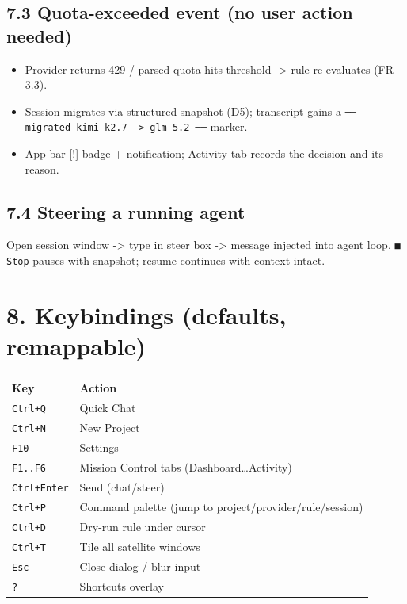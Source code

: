 \documentclass[10pt,a4paper]{article}
\begin{document}
\subsection{7.3 Quota-exceeded event (no user action needed)}
\begin{itemize}
  \item Provider returns 429 / parsed quota hits threshold -> rule re-evaluates (FR-3.3).
  \item Session migrates via structured snapshot (D5); transcript gains a
\texttt{── migrated kimi-k2.7 -> glm-5.2 ──} marker.

  \item App bar [!] badge + notification; Activity tab records the decision and its reason.
\end{itemize}
\subsection{7.4 Steering a running agent}
Open session window -> type in steer box -> message injected into agent loop. \texttt{■ Stop} pauses with snapshot; resume continues with context intact.

\section{8. Keybindings (defaults, remappable)}
\begin{small}
\begin{tabularx}{\linewidth}{lX}
\toprule
Key & Action \\
\midrule
\texttt{Ctrl+Q} & Quick Chat \\
\texttt{Ctrl+N} & New Project \\
\texttt{F10} & Settings \\
\texttt{F1..F6} & Mission Control tabs (Dashboard…Activity) \\
\texttt{Ctrl+Enter} & Send (chat/steer) \\
\texttt{Ctrl+P} & Command palette (jump to project/provider/rule/session) \\
\texttt{Ctrl+D} & Dry-run rule under cursor \\
\texttt{Ctrl+T} & Tile all satellite windows \\
\texttt{Esc} & Close dialog / blur input \\
\texttt{?} & Shortcuts overlay \\
\bottomrule
\end{tabularx}
\end{small}
\end{document}
